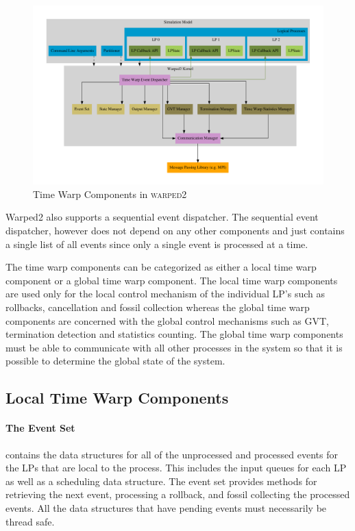\documentclass[11pt]{book}
\begin{document}
\begin{figure}[H]
    \centering
    \includegraphics[width=\textwidth,quiet]{figs/graphviz/warped2_overview.pdf}
    \caption{Time Warp Components in \textsc{warped2}}\label{warped2_architecture}
\end{figure}

Warped2 also supports a sequential event dispatcher. The sequential event dispatcher, however
does not depend on any other components and just contains a single list of all events since
only a single event is processed at a time.

The time warp components can be categorized as either a local time warp component or a global
time warp component. The local time warp components are used only for the local control
mechanism of the individual LP's such as rollbacks, cancellation and fossil collection whereas
the global time warp components are concerned with the global control mechanisms such as GVT,
termination detection and statistics counting. The global time warp components must be able to
communicate with all other processes in the system so that it is possible to determine the
global state of the system.

\subsection{Local Time Warp Components}

\paragraph{The Event Set} contains the data structures for all of the unprocessed and
processed events for the LPs that are local to the process. This includes the input queues for
each LP as well as a scheduling data structure. The event set provides methods for retrieving the
next event, processing a rollback, and fossil collecting the processed events. All the data
structures that have pending events must necessarily be thread safe.
\end{document}
